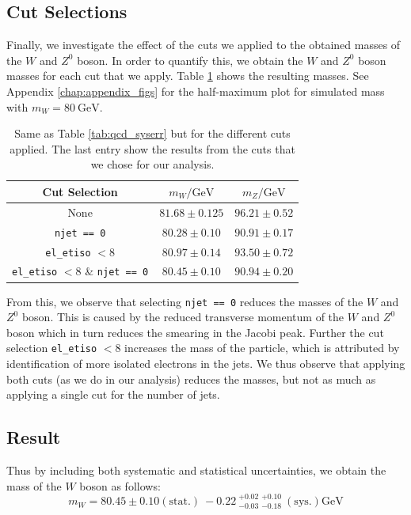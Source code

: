 \documentclass[a4paper]{report}
\numberwithin{equation}{section}
\begin{document}
 
\subsection{Cut Selections}

Finally, we investigate the effect of the cuts we applied to the obtained masses of the $W$ and $Z^0$ boson. In order to quantify this, 
we obtain the $W$ and $Z^0$ boson masses for each cut that we apply. Table \ref{tab:cut_syserr} shows the resulting masses. See Appendix \ref{chap:appendix_figs}
for the half-maximum plot for simulated mass with $m_W = \SI{80}{\giga\electronvolt}$. 

\begin{table}[htb!]
    \centering
    \begin{tabular}{|c|c|c|} \hline
    Cut Selection &  $m_W / \si{\giga\electronvolt}$ & $m_Z / \si{\giga\electronvolt}$\\ \hline
    None & $81.68 \pm 0.125$ & $96.21 \pm 0.52$ \\ 
    \texttt{njet == 0} & $80.28 \pm 0.10$ & $90.91 \pm 0.17$ \\
    \texttt{el\_etiso} $< 8$ & $80.97 \pm 0.14$ & $93.50 \pm 0.72$ \\
    \texttt{el\_etiso} $< 8$ \& \texttt{njet == 0} & $80.45 \pm 0.10 $ & $90.94 \pm 0.20$ \\ \hline
    \end{tabular}
    \caption{Same as Table \ref{tab:qcd_syserr} but for the different cuts applied. The last entry show the results from 
    the cuts that we chose for our analysis.}
    \label{tab:cut_syserr}
\end{table}

From this, we observe that selecting \texttt{njet == 0} reduces the masses of the $W$ and $Z^0$ boson. This is caused by the reduced 
transverse momentum of the $W$ and $Z^0$ boson which in turn reduces the smearing in the Jacobi peak. Further the cut selection 
\texttt{el\_etiso} $< 8$ increases the mass of the particle, which is attributed by identification of more isolated electrons in the 
jets. We thus observe that applying both cuts (as we do in our analysis) reduces the masses, but not as much as applying a single 
cut for the number of jets.

\subsection{Result}

Thus by including both systematic and statistical uncertainties, we obtain the mass of the $W$ boson as follows:
\begin{equation}
    m_W = 80.45 \pm 0.10 (\mathrm{stat.}) \: -0.22 \: ^{+0.02}_{-0.03} \: ^{+0.10}_{-0.18} \: (\mathrm{sys.}) \si{\giga\electronvolt}
\end{equation}
\end{document}
